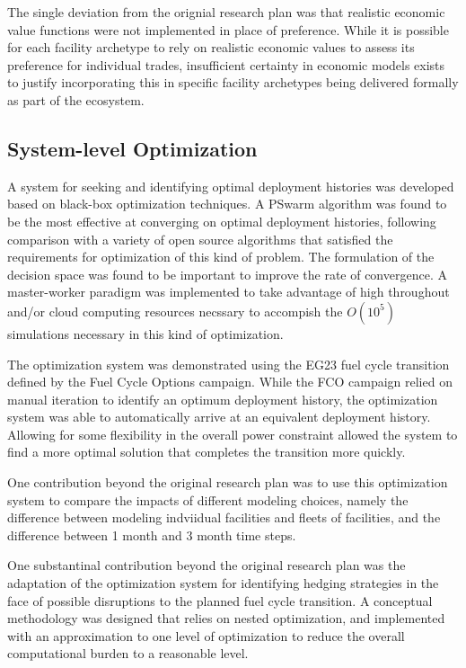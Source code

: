 The single deviation from the orignial research plan was that realistic
economic value functions were not implemented in place of preference.  While
it is possible for each facility archetype to rely on realistic economic
values to assess its preference for individual trades, insufficient certainty
in economic models exists to justify incorporating this in specific facility
archetypes being delivered formally as part of the \Cyclus{} ecosystem.

\subsection{System-level Optimization}

A system for seeking and identifying optimal deployment histories was
developed based on black-box optimization techniques.  A PSwarm algorithm was
found to be the most effective at converging on optimal deployment histories,
following comparison with a variety of open source algorithms that satisfied
the requirements for optimization of this kind of problem.  The formulation of
the decision space was found to be important to improve the rate of
convergence.  A master-worker paradigm was implemented to take advantage of
high throughout and/or cloud computing resources necssary to accompish the
$O(10^5)$ \Cyclus{} simulations necessary in this kind of optimization.

The optimization system was demonstrated using the EG23 fuel cycle transition
defined by the Fuel Cycle Options campaign.  While the FCO campaign relied on
manual iteration to identify an optimum deployment history, the optimization
system was able to automatically arrive at an equivalent deployment history.
Allowing for some flexibility in the overall power constraint allowed the
system to find a more optimal solution that completes the transition more
quickly.

One contribution beyond the original research plan was to use this
optimization system to compare the impacts of different modeling choices,
namely the difference between modeling indviidual facilities and fleets of
facilities, and the difference between 1 month and 3 month time
steps. \cite{rwc_fleet}

One substantinal contribution beyond the original research plan was the
adaptation of the optimization system for identifying hedging strategies in
the face of possible disruptions to the planned fuel cycle transition.  A
conceptual methodology was designed that relies on nested optimization, and
implemented with an approximation to one level of optimization to reduce the
overall computational burden to a reasonable level.






